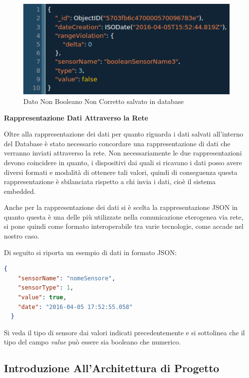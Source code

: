 \begin{figure}[ht]
\centering
\includegraphics[scale=0.5,natwidth=610,natheight=642]{Figures/DataStructures/BooleanDataViolation.png}
\caption{Dato Non Booleano Non Corretto salvato in database}
\end{figure}

\afterpage{\clearpage}

\newpage

\begin{center}
  \textbf{Rappresentazione Dati Attraverso la Rete}
\end{center}

Oltre alla rappresentazione dei dati per quanto riguarda i dati salvati all'interno del Database \`e stato necessario concordare una rappresentazione di dati che verranno inviati attraverso la rete. Non necessariamente le due rappresentazioni devono coincidere in quanto, i dispositivi dai quali si ricavano i dati posso avere diversi formati e modalit\`a di ottenere tali valori, quindi di conseguenza questa rappresentazione \`e sbilanciata rispetto a chi invia i dati, cio\`e il sistema embedded.

Anche per la rappresentazione dei dati si \`e scelta la rappresentazione JSON in quanto questa \`e una delle pi\`u utilizzate nella comunicazione eterogenea via rete, si pone quindi come formato interoperabile tra varie tecnologie, come accade nel nostro caso.

Di seguito si riporta un esempio di dati in formato JSON:

\begin{lstlisting}[language=json]
  {
    "sensorName": "nomeSensore",
    "sensorType": 1,
    "value": true,
    "date": "2016-04-05 17:52:55.058"
  }
\end{lstlisting}

Si veda il tipo di sensore dai valori indicati precedentemente e si sottolinea che il tipo del campo \textit{value} pu\`o essere sia booleano che numerico.

\subsection{Introduzione All'Architettura di Progetto}

